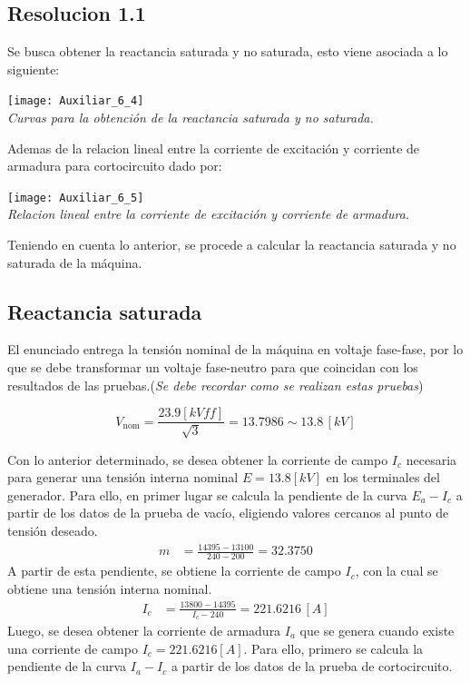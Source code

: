 \documentclass[
  11pt,
  letterpaper,
   addpoints,
   answers
  ]{exam}
\begin{document}
\begin{questions}
    
    \begin{solution}
        \subsection*{Resolucion 1.1} 
        Se busca obtener la reactancia saturada y no saturada, esto viene asociada a lo siguiente:
        \begin{center}
            \texttt{[image: Auxiliar\_6\_4]} \\
            \textit{Curvas para la obtención de la reactancia saturada y no saturada.}
        \end{center}
        Ademas de la relacion lineal entre la corriente de excitación y corriente de armadura para cortocircuito dado por:
        \begin{center}
            \texttt{[image: Auxiliar\_6\_5]} \\
            \textit{Relacion lineal entre la corriente de excitación y corriente de armadura.}
        \end{center}
        Teniendo en cuenta lo anterior, se procede a calcular la reactancia saturada y no saturada de la máquina.
        \subsection*{Reactancia saturada}
        El enunciado entrega la tensión nominal de la máquina en voltaje fase-fase, por lo que se debe transformar un voltaje fase-neutro para que coincidan con los resultados de las pruebas.(\textit{Se debe recordar como se realizan estas pruebas})
        
        \[
        V_{\text{nom}} = \frac{23.9[kVff]}{\sqrt{3}} = 13.7986 \sim 13.8 \, [kV]
        \]
        
        Con lo anterior determinado, se desea obtener la corriente de campo \( I_c \) necesaria para generar una tensión interna nominal \( E = 13.8[kV] \) en los terminales del generador. Para ello, en primer lugar se calcula la pendiente de la curva \( E_a - I_c \) a partir de los datos de la prueba de vacío, eligiendo valores cercanos al punto de tensión deseado.
        \begin{align}
        m &= \frac{14395 - 13100}{240 - 200} = 32.3750
        \end{align}
        A partir de esta pendiente, se obtiene la corriente de campo \( I_c \), con la cual se obtiene una tensión interna nominal.
        \begin{align}
        I_c &= \frac{13800 - 14395}{I_{c}-240} = 221.6216 \, [A]
        \end{align}
        Luego, se desea obtener la corriente de armadura \( I_a \) que se genera cuando existe una corriente de campo \( I_c = 221.6216 [A] \). Para ello, primero se calcula la pendiente de la curva \( I_a - I_c \) a partir de los datos de la prueba de cortocircuito.
        

\end{solution}
\end{questions}
\end{document}
